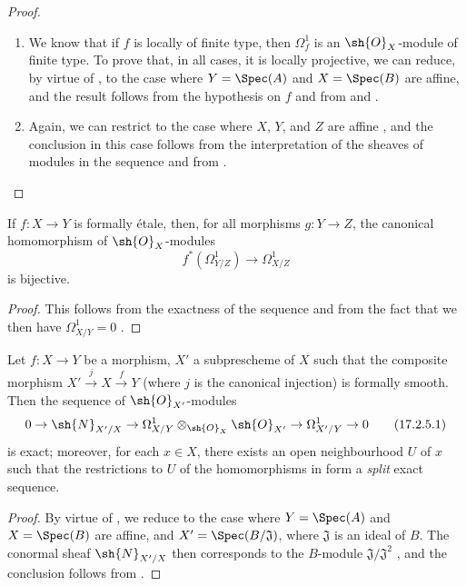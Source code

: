 \begin{proof}
\medskip\noindent
\begin{enumerate}
  \item[(i)] We know  that if $f$ is locally of finite type, then $\Omega_f^1$ is an $\sh{O}_X$-module of finite type. 
    To prove that, in all cases, it is locally projective, we can reduce, by virtue of , to the case where $Y=\Spec(A)$ and $X=\Spec(B)$ are affine, and the result follows from the hypothesis on $f$ and from  and .
  \item[(ii)] Again, we can restrict to the case where $X$, $Y$, and $Z$ are affine , and the conclusion in this case follows from the interpretation of the sheaves of modules in the sequence  and from .
\end{enumerate}
\end{proof}

\begin{corollary}[17.2.4]
\label{IV.17.2.4}
If $f:X\to Y$ is formally \'etale, then, for all morphisms $g:Y\to Z$, the canonical homomorphism of $\sh{O}_X$-modules
\[
  f^*(\Omega_{Y/Z}^1)\to\Omega_{X/Z}^1
\]
is bijective.
\end{corollary}

\begin{proof}
This follows from the exactness of the sequence  and from the fact that we then have $\Omega_{X/Y}^1=0$ .
\end{proof}

\begin{proposition}[17.2.5]
\label{IV.17.2.5}
Let $f:X\to Y$ be a morphism, $X'$ a subprescheme of $X$ such that the composite morphism $X'\xrightarrow{j}X\xrightarrow{f}Y$ (where $j$ is the canonical injection) is formally smooth.
Then the sequence of $\sh{O}_{X'}$-modules 
\[
\label{IV.17.2.5.1}
  0\to\sh{N}_{X'/X}\to\Omega_{X/Y}^1\otimes_{\sh{O}_X}\sh{O}_{X'}\to\Omega_{X'/Y}^1\to 0
\tag{17.2.5.1}
\]
is exact; moreover, for each $x\in X$, there exists an open neighbourhood $U$ of $x$ such that the restrictions to $U$ of the homomorphisms in  form a \emph{split} exact sequence.
\end{proposition}

\begin{proof}
By virtue of , we reduce to the case where $Y=\Spec(A)$ and $X=\Spec(B)$ are affine, and $X'=\Spec(B/\mathfrak{J})$, where $\mathfrak{J}$ is an ideal of $B$. 
The conormal sheaf $\sh{N}_{X'/X}$ then corresponds to the $B$-module $\mathfrak{J}/\mathfrak{J}^2$ , and the conclusion follows from .
\end{proof}

